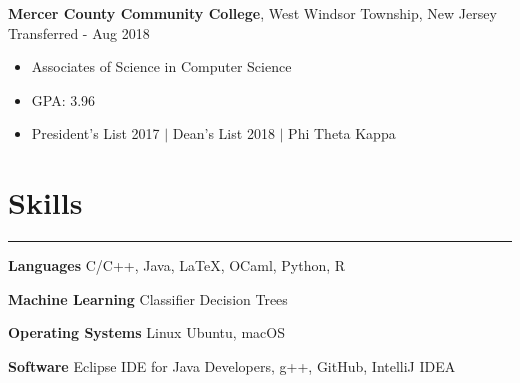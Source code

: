 \documentclass[10pt]{article}
\newcommand{\resumesection}[1]{\vspace{-0.2cm}\section*{#1}\vspace{-0.2cm}\hrule\vspace{0.2cm}}
\begin{document}
\textbf{Mercer County Community College}, West Windsor Township, New Jersey \hfill Transferred - Aug 2018
\begin{itemize}
	\item Associates of Science in Computer Science
	\item GPA: 3.96 
	\item President's List 2017 $\vert$ Dean's List 2018 $\vert$ Phi Theta Kappa
\end{itemize}


\resumesection{Skills}
\textbf{Languages} C/C++, Java, LaTeX, OCaml, Python, R

\textbf{Machine Learning} Classifier Decision Trees

\textbf{Operating Systems} Linux Ubuntu, macOS

\textbf{Software} Eclipse IDE for Java Developers, g++, GitHub, IntelliJ IDEA


%
\end{document}
